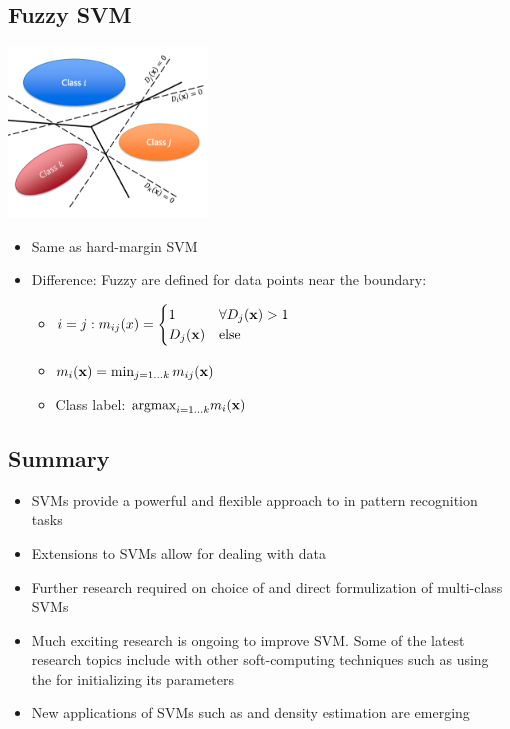 \documentclass{tron}
\begin{document}
\subsection{Fuzzy SVM}
\begin{definition}{}
	\includegraphics[width=200px]{Figs/slide8/svm-fuzzy}
	
	\begin{itemize}
		\item Same as hard-margin SVM
		\item Difference: Fuzzy  are defined for data points near the boundary:
		\begin{itemize}
			\item $i = j : m_{ij}(x) = \begin{cases} 1 & \forall D_j(\mathbf{x}) > 1 \\  D_j(\mathbf{x}) & \text{else}\end{cases}$
			\item $m_i(\mathbf{x}) = \min_{j=1\dots k} m_{ij} (\mathbf{x})$ 
			\item Class label: $\text{argmax}_{i=1\dots k}m_i(\mathbf{x})$
		\end{itemize}
	\end{itemize}
\end{definition}

\newpage
\subsection{Summary}
\begin{itemize}
	\item SVMs provide a powerful and flexible approach to  in pattern recognition tasks
	\item Extensions to SVMs allow for dealing with  data
	\item Further research required on choice of  and direct formulization of multi-class SVMs
	\item Much exciting research is ongoing to improve SVM. Some of the latest research topics include  with other soft-computing techniques such as using the  for initializing its parameters
	\item New applications of SVMs such as  and density estimation are emerging
\end{itemize}
\end{document}
